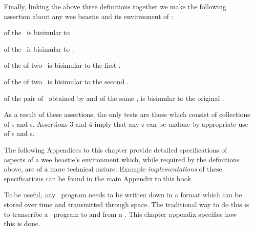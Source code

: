 Finally, linking the above three definitions together we make the 
following assertion about any wee beastie and its environment of \lols: 

\begingroup\startAssertion

\startitemize[n]

\item {} of the  \lol\ is bisimular to 
. 

\item {} of the  \lol\ is bisimular to 
. 

\item {} of the  of two \lols\ is 
bisimular to the first \lol. 

\item {} of the  of two \lols\ is 
bisimular to the second \lol. 

\item {} of the pair of \lols\ obtained by 
 and  of the same \lol, is bisimular 
to the original \lol. 

\stopAssertion\endgroup

As a result of these assertions, the only  tests are 
those which consist of collections of s and 
s. Assertions 3 and 4 imply that any 
s can be undone by appropriate use of 
s and s.  

\startChapterAppendices

The following Appendices to this chapter provide detailed specifications 
of aspects of a wee beastie's environment which, while required by the 
definitions above, are of a more technical nature. Example 
\emph{implementations} of these specifications can be found in the 
main Appendix \in[implementation] to this book.

\chapterAppendix[title={Texts: transcribing Lists of Lists}]

To be useful, any \joylol\ program needs to be written down in a format 
which can be stored over time and transmitted through space. The 
traditional way to do this is to transcribe a \joylol\ program to and from 
a . This chapter appendix specifies how this 
is done. 

